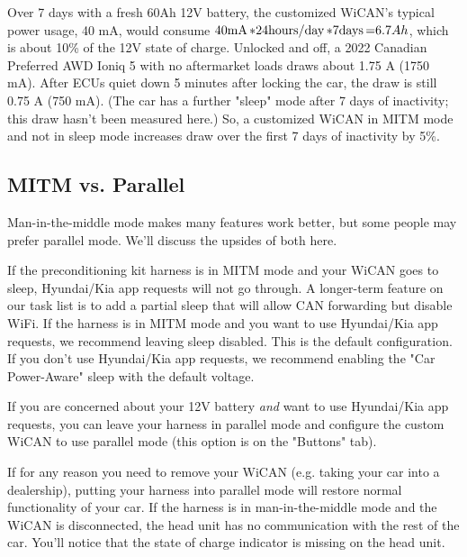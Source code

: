 \documentclass[superscriptaddress,onecolumn,floatfix]{revtex4-2}
\begin{document}
Over 7 days with a fresh 60Ah 12V battery, the customized WiCAN's typical power usage, 40 mA, would consume $40 \unit[\mathrm{mA}] * 24 \unit[\mathrm{hours/day}] * 7 \unit[\mathrm{days}] = 6.7 Ah$, which is about 10\% of the 12V state of charge. Unlocked and off, a 2022 Canadian Preferred AWD Ioniq 5 with no aftermarket loads draws about 1.75 A (1750 mA). After ECUs quiet down 5 minutes after locking the car, the draw is still 0.75 A (750 mA). (The car has a further "sleep" mode after 7 days of inactivity; this draw hasn't been measured here.) So, a customized WiCAN in MITM mode and not in sleep mode increases draw over the first 7 days of inactivity by 5\%.

\subsection{MITM vs. Parallel}
Man-in-the-middle mode makes many features work better, but some people may prefer parallel mode. We'll discuss the upsides of both here.

If the preconditioning kit harness is in MITM mode and your WiCAN goes to sleep, Hyundai/Kia app requests will not go through. A longer-term feature on our task list is to add a partial sleep that will allow CAN forwarding but disable WiFi. If the harness is in MITM mode and you want to use Hyundai/Kia app requests, we recommend leaving sleep disabled. This is the default configuration. If you don't use Hyundai/Kia app requests, we recommend enabling the "Car Power-Aware" sleep with the default voltage. 

If you are concerned about your 12V battery {\it and} want to use Hyundai/Kia app requests, you can leave your harness in parallel mode and configure the custom WiCAN to use parallel mode (this option is on the "Buttons" tab).

If for any reason you need to remove your WiCAN (e.g. taking your car into a dealership), putting your harness into parallel mode will restore normal functionality of your car. If the harness is in man-in-the-middle mode and the WiCAN is disconnected, the head unit has no communication with the rest of the car. You'll notice that the state of charge indicator is missing on the head unit. 
\end{document}
